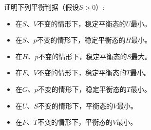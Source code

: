 \documentclass[12pt,a4paper]{article}
\newenvironment{problem}[2][Problem]{\begin{trivlist}
\item[\hskip \labelsep {\bfseries #1}\hskip \labelsep {\bfseries #2.}]}{\end{trivlist}}
\begin{document}
\begin{problem}{3.1}
证明下列平衡判据（假设$S>0$）:
\begin{itemize}
\item[（a）] 在$S$、$V$不变的情形下，稳定平衡态的$U$最小。
\item[（b）] 在$S$、$p$不变的情形下，稳定平衡态的$H$最小。
\item[（c）] 在$H$、$p$不变的情形下，稳定平衡态的$S$最大。
\item[（d）] 在$F$、$V$不变的情形下，稳定平衡态的$T$最小。
\item[（e）] 在$G$、$p$不变的情形下，稳定平衡态的$T$最小。
\item[（f）] 在$U$、$S$不变的情形下，平衡态的$V$最小。
\item[（g）] 在$F$、$T$不变的情形下，平衡态的$V$最小。
\end{itemize}
\end{problem}
\end{document}
